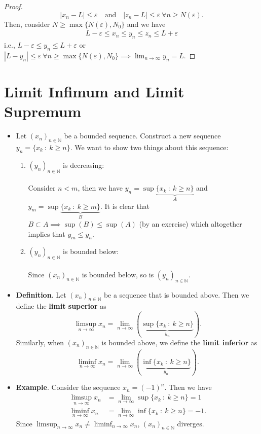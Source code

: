 \documentclass{article}
\newcommand{\N}{\mathbb{N}}
\newcommand{\seq}[2]{(#1_{#2})_{#2 \in \N}}
\newcommand{\mylim}[2]{\lim_{#1 \to #2}}
\newcommand{\mylimmm}[2]{\lim\limits_{#1 \to #2}}
\newcommand{\?}{\stackrel{?}{=}}
\begin{document}
\begin{itemize}
\begin{proof}
            $$|x_n - L| \leq \varepsilon \quad \text{and} \quad |z_n - L| \leq \varepsilon \ \forall n \geq N(\varepsilon).$$
            Then, consider $N \geq \max\{N(\varepsilon), N_0\}$ and we have
            \begin{align*}
                L - \varepsilon \leq x_n \leq y_n \leq z_n \leq L + \varepsilon
            \end{align*}
            i.e., $L - \varepsilon \leq y_n \leq L + \varepsilon$ or $|L - y_n| \leq \varepsilon \ \forall n \geq \max\{N(\varepsilon), N_0\} \implies \mylim{n}{\infty} y_n = L$.
        \end{proof}
\end{itemize}

\section*{Limit Infimum and Limit Supremum}

\begin{itemize}
    \item Let $\seq{x}{n}$ be a bounded sequence. Construct a new sequence $y_n = \{x_k \ : \ k \geq n\}$. We want to show two things about this sequence:
    \begin{enumerate}[label=(\arabic*)]
        \item $\seq{y}{n}$ is decreasing: \\\\
        Consider $n < m$, then we have $y_n = \sup\underbrace{\{x_k \ : \ k \geq n\}}_{A}$ and $y_m = \sup\underbrace{\{x_k \ : \ k \geq m\}}_{B}$. It is clear that $B \subset A \implies \sup(B) \leq \sup(A)$ (by an exercise) which altogether implies that $y_m \leq y_n$.
        \item $\seq{y}{n}$ is bounded below: \\\\
        Since $\seq{x}{n}$ is bounded below, so is $\seq{y}{n}$.
    \end{enumerate}
    \item \textbf{Definition}. Let $\seq{x}{n}$ be a sequence that is bounded above. Then we define the \textbf{limit superior} as
    $$\limsup_{n \to \infty} x_n = \mylimmm{n}{\infty} \left(\underbrace{\sup\{x_k \ : \ k \geq n\}}_{y_n}\right).$$
    Similarly, when $\seq{x}{n}$ is bounded above, we define the \textbf{limit inferior} as
    $$\liminf_{n \to \infty} x_n = \mylimmm{n}{\infty} \left(\underbrace{\inf\{x_k \ : \ k \geq n\}}_{y_n}\right).$$
    \item \textbf{Example}. Consider the sequence $x_n = (-1)^n$. Then we have
    \begin{align*}
        \limsup_{n \to \infty} x_n &= \mylimmm{n}{\infty} \sup\{x_k \ : \ k \geq n\} = 1 \\
        \liminf_{n \to \infty} x_n &= \mylimmm{n}{\infty} \inf\{x_k \ : \ k \geq n\} = -1.
    \end{align*}
    Since $\limsup_{n \to \infty} x_n \neq \liminf_{n \to \infty} x_n$, $\seq{x}{n}$ diverges.
\end{itemize}
 
\end{document}
